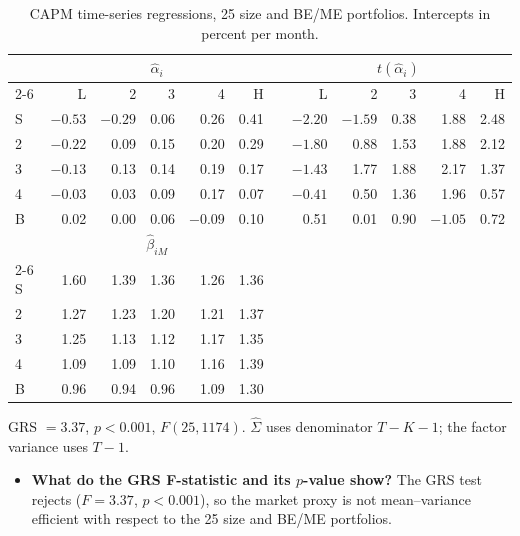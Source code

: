 \documentclass[11pt]{article}
\begin{document}
\begin{table}[H]
\centering
\caption{CAPM time-series regressions, 25 size and BE/ME portfolios.
Intercepts in percent per month.}
\small
\begin{tabular}{lrrrrrcrrrrr}
\toprule
& \multicolumn{5}{c}{$\hat\alpha_i$} && \multicolumn{5}{c}{$t(\hat\alpha_i)$} \\
\cmidrule{2-6}\cmidrule{8-12}
& L & 2 & 3 & 4 & H && L & 2 & 3 & 4 & H \\
\midrule
S & $-0.53$ & $-0.29$ & 0.06 & 0.26 & 0.41 && $-2.20$ & $-1.59$ & 0.38 & 1.88 & 2.48 \\
2 & $-0.22$ & 0.09 & 0.15 & 0.20 & 0.29 && $-1.80$ & 0.88 & 1.53 & 1.88 & 2.12 \\
3 & $-0.13$ & 0.13 & 0.14 & 0.19 & 0.17 && $-1.43$ & 1.77 & 1.88 & 2.17 & 1.37 \\
4 & $-0.03$ & 0.03 & 0.09 & 0.17 & 0.07 && $-0.41$ & 0.50 & 1.36 & 1.96 & 0.57 \\
B & 0.02 & 0.00 & 0.06 & $-0.09$ & 0.10 && 0.51 & 0.01 & 0.90 & $-1.05$ & 0.72 \\
\midrule
& \multicolumn{5}{c}{$\hat\beta_{iM}$} && \multicolumn{5}{c}{} \\
\cmidrule{2-6}
S & 1.60 & 1.39 & 1.36 & 1.26 & 1.36 &&&&&& \\
2 & 1.27 & 1.23 & 1.20 & 1.21 & 1.37 &&&&&& \\
3 & 1.25 & 1.13 & 1.12 & 1.17 & 1.35 &&&&&& \\
4 & 1.09 & 1.09 & 1.10 & 1.16 & 1.39 &&&&&& \\
B & 0.96 & 0.94 & 0.96 & 1.09 & 1.30 &&&&&& \\
\bottomrule
\end{tabular}
\label{tab:p3f_capm}
\vspace{2pt}\begin{minipage}{0.93\textwidth}\footnotesize
GRS $= 3.37$, $p < 0.001$, $F(25, 1174)$. $\hat\Sigma$ uses denominator
$T-K-1$; the factor variance uses $T-1$.
\end{minipage}
\end{table}

\begin{itemize}
\setlength{\itemsep}{4pt}\setlength{\parskip}{0pt}

\item \textbf{What do the GRS F-statistic and its $p$-value show?} The GRS test rejects ($F = 3.37$, $p < 0.001$), so the market proxy is not mean--variance efficient with respect to the 25 size and BE/ME
portfolios.

\end{itemize}
\end{document}
